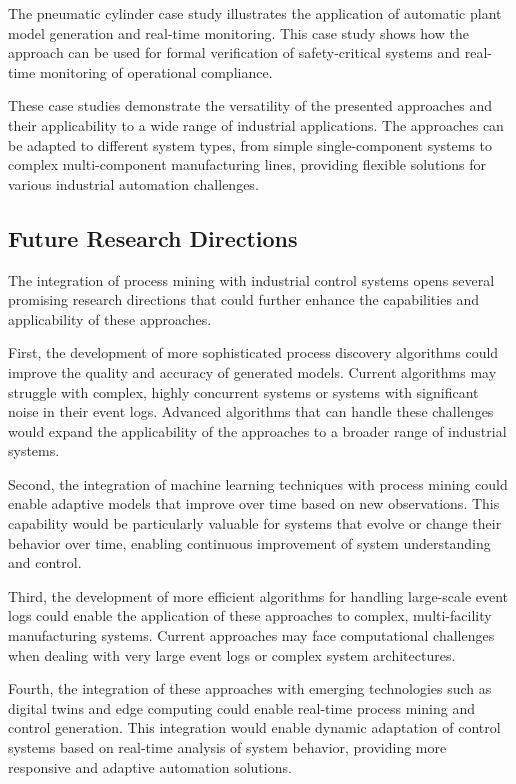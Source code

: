 The pneumatic cylinder case study illustrates the application of automatic plant model generation and real-time monitoring. This case study shows how the approach can be used for formal verification of safety-critical systems and real-time monitoring of operational compliance.



These case studies demonstrate the versatility of the presented approaches and their applicability to a wide range of industrial applications. The approaches can be adapted to different system types, from simple single-component systems to complex multi-component manufacturing lines, providing flexible solutions for various industrial automation challenges.

\subsection{Future Research Directions}

The integration of process mining with industrial control systems opens several promising research directions that could further enhance the capabilities and applicability of these approaches.

First, the development of more sophisticated process discovery algorithms could improve the quality and accuracy of generated models. Current algorithms may struggle with complex, highly concurrent systems or systems with significant noise in their event logs. Advanced algorithms that can handle these challenges would expand the applicability of the approaches to a broader range of industrial systems.

Second, the integration of machine learning techniques with process mining could enable adaptive models that improve over time based on new observations. This capability would be particularly valuable for systems that evolve or change their behavior over time, enabling continuous improvement of system understanding and control.

Third, the development of more efficient algorithms for handling large-scale event logs could enable the application of these approaches to complex, multi-facility manufacturing systems. Current approaches may face computational challenges when dealing with very large event logs or complex system architectures.

Fourth, the integration of these approaches with emerging technologies such as digital twins and edge computing could enable real-time process mining and control generation. This integration would enable dynamic adaptation of control systems based on real-time analysis of system behavior, providing more responsive and adaptive automation solutions.

